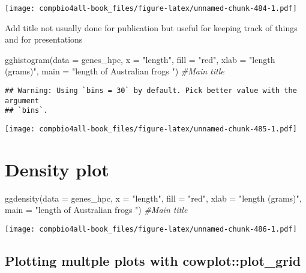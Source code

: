 \documentclass[
]{book}
\newenvironment{Shaded}{\begin{snugshade}}{\end{snugshade}}
\newcommand{\AttributeTok}[1]{\textcolor[rgb]{0.77,0.63,0.00}{#1}}
\newcommand{\CommentTok}[1]{\textcolor[rgb]{0.56,0.35,0.01}{\textit{#1}}}
\newcommand{\FunctionTok}[1]{\textcolor[rgb]{0.00,0.00,0.00}{#1}}
\newcommand{\NormalTok}[1]{#1}
\newcommand{\StringTok}[1]{\textcolor[rgb]{0.31,0.60,0.02}{#1}}
\begin{document}
\texttt{[image: compbio4all-book\_files/figure-latex/unnamed-chunk-484-1.pdf]}

Add title
not usually done for publication but useful for keeping track of things and for presentations

\begin{Shaded}
\begin{Highlighting}[]
\FunctionTok{gghistogram}\NormalTok{(}\AttributeTok{data =}\NormalTok{ genes\_hpc,}
            \AttributeTok{x =} \StringTok{"length"}\NormalTok{,}
            \AttributeTok{fill =} \StringTok{"red"}\NormalTok{,}
            \AttributeTok{xlab =} \StringTok{"length (grams)"}\NormalTok{,}
          \AttributeTok{main =} \StringTok{"length of Australian frogs "}\NormalTok{) }\CommentTok{\#Main title}
\end{Highlighting}
\end{Shaded}

\begin{verbatim}
## Warning: Using `bins = 30` by default. Pick better value with the argument
## `bins`.
\end{verbatim}

\texttt{[image: compbio4all-book\_files/figure-latex/unnamed-chunk-485-1.pdf]}

\hypertarget{density-plot}{%
\section{Density plot}\label{density-plot}}

\begin{Shaded}
\begin{Highlighting}[]
\FunctionTok{ggdensity}\NormalTok{(}\AttributeTok{data =}\NormalTok{ genes\_hpc,}
            \AttributeTok{x =} \StringTok{"length"}\NormalTok{,}
            \AttributeTok{fill =} \StringTok{"red"}\NormalTok{,}
            \AttributeTok{xlab =} \StringTok{"length (grams)"}\NormalTok{,}
          \AttributeTok{main =} \StringTok{"length of Australian frogs "}\NormalTok{) }\CommentTok{\#Main title}
\end{Highlighting}
\end{Shaded}

\texttt{[image: compbio4all-book\_files/figure-latex/unnamed-chunk-486-1.pdf]}

\hypertarget{plotting-multple-plots-with-cowplotplot_grid-1}{%
\subsection{Plotting multple plots with cowplot::plot\_grid}\label{plotting-multple-plots-with-cowplotplot_grid-1}}
\end{document}
